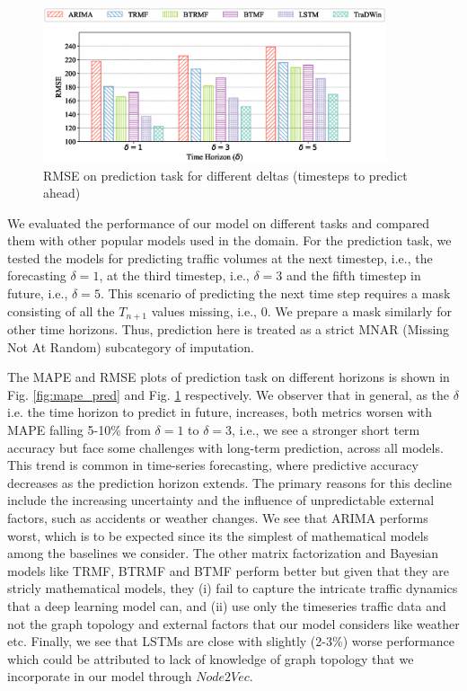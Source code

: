 \documentclass[conference]{IEEEtran}
\begin{document}
\begin{figure}[]
    \centering
    \includegraphics[width=0.9\textwidth]{rmse_pred.eps}
    \caption{RMSE on prediction task for different deltas (timesteps to predict ahead)}
    \label{fig:rmse_pred}
\end{figure}

We evaluated the performance of our model on different tasks and compared them with other popular models used in the domain. For the prediction task, we tested the models for predicting traffic volumes at the next timestep, i.e., the forecasting $\delta = 1$, at the third timestep, i.e., $\delta = 3$ and the fifth timestep in future, i.e., $\delta = 5$. This scenario of predicting the next time step requires a mask consisting of all the $T_{n+1}$ values missing, i.e., 0. We prepare a mask similarly for other time horizons. Thus, prediction here is treated as a strict MNAR (Missing Not At Random) subcategory of imputation.

The MAPE and RMSE plots of prediction task on different horizons is shown in Fig. \ref{fig:mape_pred} and Fig. \ref{fig:rmse_pred} respectively. We observer that in general, as the $\delta$ i.e. the time horizon to predict in future, increases, both metrics worsen with MAPE falling 5-10\% from $\delta=1$ to $\delta=3$, i.e., we see a stronger short term accuracy but face some challenges with long-term prediction, across all models. This trend is common in time-series forecasting, where predictive accuracy decreases as the prediction horizon extends. The primary reasons for this decline include the increasing uncertainty and the influence of unpredictable external factors, such as accidents or weather changes. We see that ARIMA performs worst, which is to be expected since its the simplest of mathematical models among the baselines we consider. The other matrix factorization and Bayesian models like TRMF, BTRMF and BTMF perform better but given that they are stricly mathematical models, they (i) fail to capture the intricate traffic dynamics that a deep learning model can, and (ii) use only the timeseries traffic data and not the graph topology and external factors that our model considers like weather etc. Finally, we see that LSTMs are close with slightly (2-3\%) worse performance which could be attributed to lack of knowledge of graph topology that we incorporate in our model through $Node2Vec$.
\end{document}
